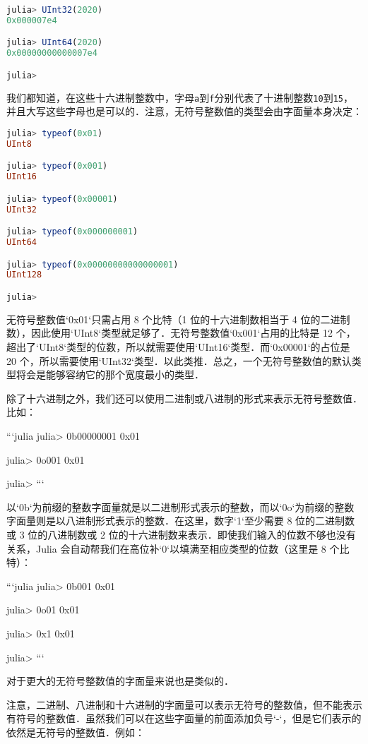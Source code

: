 \begin{lstlisting}[language=julia]
julia> UInt32(2020)
0x000007e4

julia> UInt64(2020)
0x00000000000007e4

julia> 
\end{lstlisting}

我们都知道，在这些十六进制整数中，字母\verb|a|到\verb|f|分别代表了十进制整数\verb|10|到\verb|15|，并且大写这些字母也是可以的．注意，无符号整数值的类型会由字面量本身决定：

\begin{lstlisting}[language=julia]
julia> typeof(0x01)
UInt8

julia> typeof(0x001)
UInt16

julia> typeof(0x00001)
UInt32

julia> typeof(0x000000001)
UInt64

julia> typeof(0x00000000000000001)
UInt128

julia> 
\end{lstlisting}

无符号整数值`0x01`只需占用 8 个比特（1 位的十六进制数相当于 4 位的二进制数），因此使用`UInt8`类型就足够了．无符号整数值`0x001`占用的比特是 12 个，超出了`UInt8`类型的位数，所以就需要使用`UInt16`类型．而`0x00001`的占位是 20 个，所以需要使用`UInt32`类型．以此类推．总之，一个无符号整数值的默认类型将会是能够容纳它的那个宽度最小的类型．

除了十六进制之外，我们还可以使用二进制或八进制的形式来表示无符号整数值．比如：

```julia
julia> 0b00000001
0x01

julia> 0o001
0x01

julia> 
```

以`0b`为前缀的整数字面量就是以二进制形式表示的整数，而以`0o`为前缀的整数字面量则是以八进制形式表示的整数．在这里，数字`1`至少需要 8 位的二进制数或 3 位的八进制数或 2 位的十六进制数来表示．即使我们输入的位数不够也没有关系，Julia 会自动帮我们在高位补`0`以填满至相应类型的位数（这里是 8 个比特）：

```julia
julia> 0b001
0x01

julia> 0o01
0x01

julia> 0x1
0x01

julia>
```

对于更大的无符号整数值的字面量来说也是类似的．

注意，二进制、八进制和十六进制的字面量可以表示无符号的整数值，但不能表示有符号的整数值．虽然我们可以在这些字面量的前面添加负号`-`，但是它们表示的依然是无符号的整数值．例如：

